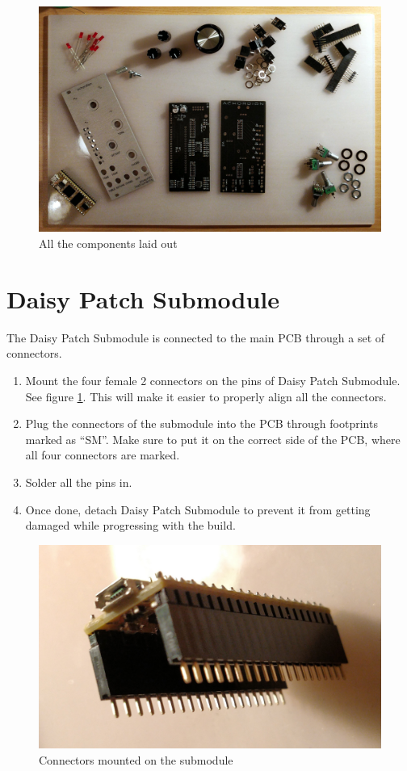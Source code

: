 \documentclass[10pt,a4paper,twocolumn]{article}
\begin{document}
\begin{figure}[p]
  \centering
  \includegraphics[width=\linewidth]{p01.jpg}
  \caption{All the components laid out}
\end{figure}

\section{Daisy Patch Submodule}

The Daisy Patch Submodule is connected to the main PCB through a set of connectors.

\begin{enumerate}
  \item Mount the four female 2 connectors on the pins of Daisy Patch Submodule. See figure \ref{daisy}. This will make it easier to properly align all the connectors.
  \item Plug the connectors of the submodule into the PCB through footprints marked as ``SM''. Make sure to put it on the correct side of the PCB, where all four connectors are marked.
  \item Solder all the pins in.
  \item Once done, detach Daisy Patch Submodule to prevent it from getting damaged while progressing with the build.
\end{enumerate}

\begin{figure}[p]
  \centering
  \includegraphics[width=\linewidth]{p04.jpg}
  \caption{Connectors mounted on the submodule}
  \label{daisy}
\end{figure}
\end{document}
